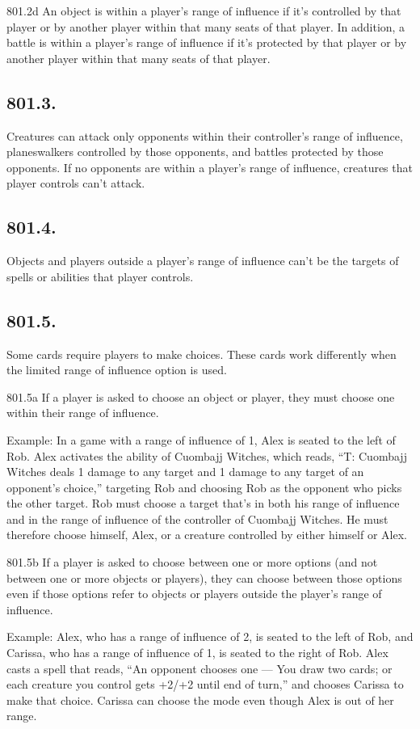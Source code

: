 801.2d An object is within a player’s range of influence if it’s controlled by that player or by another player within that many seats of that player. In addition, a battle is within a player’s range of influence if it’s protected by that player or by another player within that many seats of that player.

\subsection*{801.3.}
Creatures can attack only opponents within their controller’s range of influence, planeswalkers controlled by those opponents, and battles protected by those opponents. If no opponents are within a player’s range of influence, creatures that player controls can’t attack.

\subsection*{801.4.}
Objects and players outside a player’s range of influence can’t be the targets of spells or abilities that player controls.

\subsection*{801.5.}
Some cards require players to make choices. These cards work differently when the limited range of influence option is used.

801.5a If a player is asked to choose an object or player, they must choose one within their range of influence.

Example: In a game with a range of influence of 1, Alex is seated to the left of Rob. Alex activates the ability of Cuombajj Witches, which reads, “{T}: Cuombajj Witches deals 1 damage to any target and 1 damage to any target of an opponent’s choice,” targeting Rob and choosing Rob as the opponent who picks the other target. Rob must choose a target that’s in both his range of influence and in the range of influence of the controller of Cuombajj Witches. He must therefore choose himself, Alex, or a creature controlled by either himself or Alex.

801.5b If a player is asked to choose between one or more options (and not between one or more objects or players), they can choose between those options even if those options refer to objects or players outside the player’s range of influence.

Example: Alex, who has a range of influence of 2, is seated to the left of Rob, and Carissa, who has a range of influence of 1, is seated to the right of Rob. Alex casts a spell that reads, “An opponent chooses one — You draw two cards; or each creature you control gets +2/+2 until end of turn,” and chooses Carissa to make that choice. Carissa can choose the mode even though Alex is out of her range.

